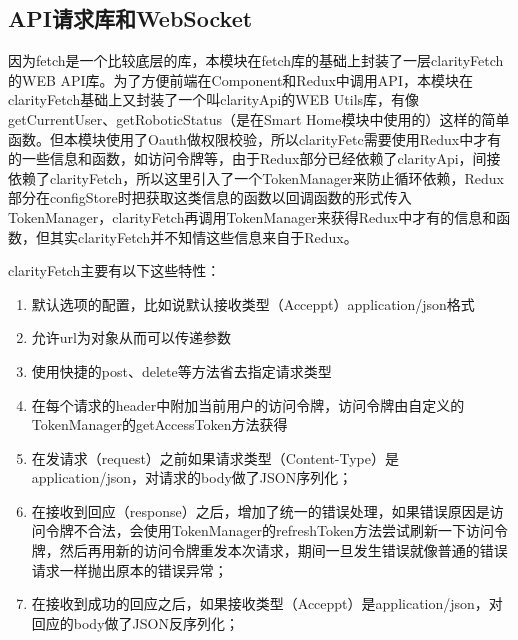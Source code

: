 \subsection{API请求库和WebSocket}
因为fetch是一个比较底层的库，本模块在fetch库的基础上封装了一层clarityFetch的WEB API库。为了方便前端在Component和Redux中调用API，本模块在clarityFetch基础上又封装了一个叫clarityApi的WEB Utils库，有像getCurrentUser、getRoboticStatus（是在Smart Home模块中使用的）这样的简单函数。但本模块使用了Oauth做权限校验，所以clarityFetc需要使用Redux中才有的一些信息和函数，如访问令牌等，由于Redux部分已经依赖了clarityApi，间接依赖了clarityFetch，所以这里引入了一个TokenManager来防止循环依赖，Redux部分在configStore时把获取这类信息的函数以回调函数的形式传入TokenManager，clarityFetch再调用TokenManager来获得Redux中才有的信息和函数，但其实clarityFetch并不知情这些信息来自于Redux。

clarityFetch主要有以下这些特性：
\begin{enumerate}
  \item 默认选项的配置，比如说默认接收类型（Acceppt）application/json格式
  \item 允许url为对象从而可以传递参数
  \item 使用快捷的post、delete等方法省去指定请求类型
  \item 在每个请求的header中附加当前用户的访问令牌，访问令牌由自定义的TokenManager的getAccessToken方法获得
  \item 在发请求（request）之前如果请求类型（Content-Type）是application/json，对请求的body做了JSON序列化；
  \item 在接收到回应（response）之后，增加了统一的错误处理，如果错误原因是访问令牌不合法，会使用TokenManager的refreshToken方法尝试刷新一下访问令牌，然后再用新的访问令牌重发本次请求，期间一旦发生错误就像普通的错误请求一样抛出原本的错误异常；
  \item 在接收到成功的回应之后，如果接收类型（Acceppt）是application/json，对回应的body做了JSON反序列化；
\end{enumerate}

